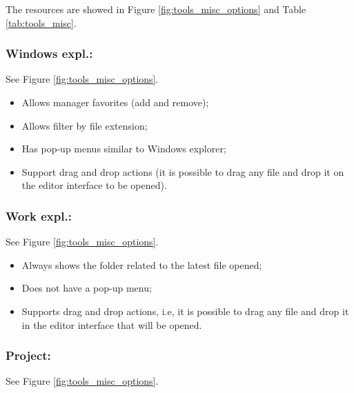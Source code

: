 The resources are showed in
Figure \ref{fig:tools_misc_options} and
Table \ref{tab:tools_misc}.


\hypertarget{working_tools_misc_windowsexpl}{}
\subsubsection{Windows expl.:}

See Figure \ref{fig:tools_misc_options}.

\begin{itemize}
  \item Allows manager favorites (add and remove);
  \item Allows filter by file extension;
  \item Has pop-up menus similar to Windows explorer;
  \item Support drag and drop actions (it is possible to drag
    any file and drop it on the editor interface to be opened).
\end{itemize}


\hypertarget{working_tools_misc_workexpl}{}
\subsubsection{Work expl.:}

See Figure \ref{fig:tools_misc_options}.

\begin{itemize}
  \item Always shows the folder related to the latest file opened;
  \item Does not have a pop-up menu;
  \item Supports drag and drop actions, i.e, it is possible to drag any
    file and drop it in the editor interface that will be opened.
\end{itemize}


\hypertarget{working_tools_misc_project}{}
\subsubsection{Project:}

See Figure \ref{fig:tools_misc_options}.


